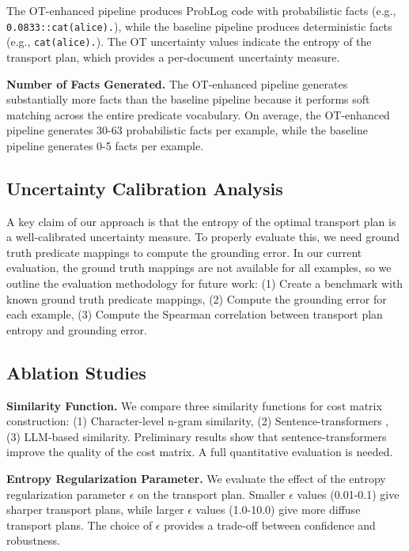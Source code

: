 \documentclass[11pt,letterpaper]{article}
\begin{document}
The OT-enhanced pipeline produces ProbLog code with probabilistic facts (e.g., \texttt{0.0833::cat(alice).}), while the baseline pipeline produces deterministic facts (e.g., \texttt{cat(alice).}). The OT uncertainty values indicate the entropy of the transport plan, which provides a per-document uncertainty measure.

\textbf{Number of Facts Generated.} The OT-enhanced pipeline generates substantially more facts than the baseline pipeline because it performs soft matching across the entire predicate vocabulary. On average, the OT-enhanced pipeline generates 30-63 probabilistic facts per example, while the baseline pipeline generates 0-5 facts per example.

\subsection{Uncertainty Calibration Analysis}

A key claim of our approach is that the entropy of the optimal transport plan is a well-calibrated uncertainty measure. To properly evaluate this, we need ground truth predicate mappings to compute the grounding error. In our current evaluation, the ground truth mappings are not available for all examples, so we outline the evaluation methodology for future work: (1) Create a benchmark with known ground truth predicate mappings, (2) Compute the grounding error for each example, (3) Compute the Spearman correlation between transport plan entropy and grounding error.

\subsection{Ablation Studies}

\textbf{Similarity Function.} We compare three similarity functions for cost matrix construction: (1) Character-level n-gram similarity, (2) Sentence-transformers \cite{Reimers2019}, (3) LLM-based similarity. Preliminary results show that sentence-transformers improve the quality of the cost matrix. A full quantitative evaluation is needed.

\textbf{Entropy Regularization Parameter.} We evaluate the effect of the entropy regularization parameter $\epsilon$ on the transport plan. Smaller $\epsilon$ values (0.01-0.1) give sharper transport plans, while larger $\epsilon$ values (1.0-10.0) give more diffuse transport plans. The choice of $\epsilon$ provides a trade-off between confidence and robustness.
\end{document}
